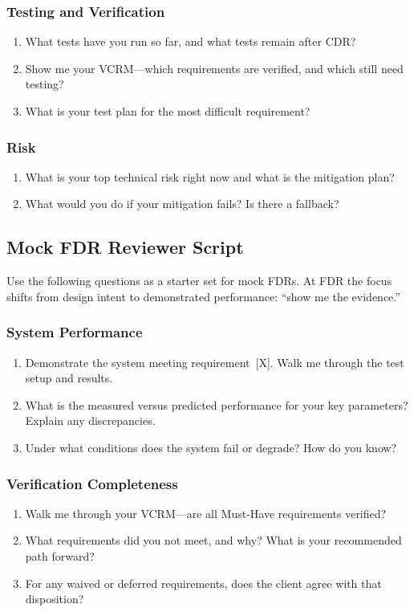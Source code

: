 \subsubsection*{Testing and Verification}
\begin{enumerate}[nosep,leftmargin=1.5em,start=11]
\item What tests have you run so far, and what tests remain after CDR?
\item Show me your VCRM---which requirements are verified, and which still need testing?
\item What is your test plan for the most difficult requirement?
\end{enumerate}

\subsubsection*{Risk}
\begin{enumerate}[nosep,leftmargin=1.5em,start=14]
\item What is your top technical risk right now and what is the mitigation plan?
\item What would you do if your mitigation fails? Is there a fallback?
\end{enumerate}

\subsection{Mock FDR Reviewer Script}

Use the following questions as a starter set for mock FDRs. At FDR the focus shifts from design intent to demonstrated performance: ``show me the evidence.''

\subsubsection*{System Performance}
\begin{enumerate}[nosep,leftmargin=1.5em]
\item Demonstrate the system meeting requirement~[X]. Walk me through the test setup and results.
\item What is the measured versus predicted performance for your key parameters? Explain any discrepancies.
\item Under what conditions does the system fail or degrade? How do you know?
\end{enumerate}

\subsubsection*{Verification Completeness}
\begin{enumerate}[nosep,leftmargin=1.5em,start=4]
\item Walk me through your VCRM---are all Must-Have requirements verified?
\item What requirements did you not meet, and why? What is your recommended path forward?
\item For any waived or deferred requirements, does the client agree with that disposition?
\end{enumerate}

